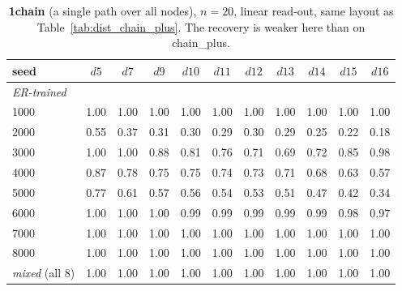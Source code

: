 \documentclass[11pt,a4paper]{article}
\begin{document}
\begin{table}[H]\centering\small
\begin{tabular}{lcccccccccc}
\toprule
seed & $d5$ & $d7$ & $d9$ & $d10$ & $d11$ & $d12$ & $d13$ & $d14$ & $d15$ & $d16$ \\
\midrule
\multicolumn{11}{l}{\emph{ER-trained}}\\
1000 & 1.00 & 1.00 & 1.00 & 1.00 & 1.00 & 1.00 & 1.00 & 1.00 & 1.00 & 1.00 \\
2000 & 0.55 & 0.37 & 0.31 & 0.30 & 0.29 & 0.30 & 0.29 & 0.25 & 0.22 & 0.18 \\
3000 & 1.00 & 1.00 & 0.88 & 0.81 & 0.76 & 0.71 & 0.69 & 0.72 & 0.85 & 0.98 \\
4000 & 0.87 & 0.78 & 0.75 & 0.75 & 0.74 & 0.73 & 0.71 & 0.68 & 0.63 & 0.57 \\
5000 & 0.77 & 0.61 & 0.57 & 0.56 & 0.54 & 0.53 & 0.51 & 0.47 & 0.42 & 0.34 \\
6000 & 1.00 & 1.00 & 1.00 & 0.99 & 0.99 & 0.99 & 0.99 & 0.99 & 0.98 & 0.97 \\
7000 & 1.00 & 1.00 & 1.00 & 1.00 & 1.00 & 1.00 & 1.00 & 1.00 & 1.00 & 1.00 \\
8000 & 1.00 & 1.00 & 1.00 & 1.00 & 1.00 & 1.00 & 1.00 & 1.00 & 1.00 & 1.00 \\
\midrule
\emph{mixed} (all 8) & 1.00 & 1.00 & 1.00 & 1.00 & 1.00 & 1.00 & 1.00 & 1.00 & 1.00 & 1.00 \\
\bottomrule\end{tabular}
\caption{\textbf{1chain} (a single path over all nodes), $n=20$, linear read-out, same layout as
Table~\ref{tab:dist_chain_plus}. The recovery is weaker here than on chain\_plus.}
\label{tab:dist_1chain}
\end{table}
\end{document}
